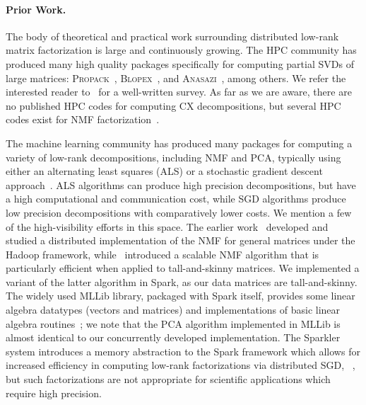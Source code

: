 \paragraph{Prior Work.}The body of theoretical and practical work surrounding distributed low-rank matrix factorization is large and continuously growing. The HPC community has produced many high quality packages specifically for computing partial SVDs of large matrices: \textsc{Propack}~\cite{larsen1998lanczos}, \textsc{Blopex}~\cite{blopex2007}, and \textsc{Anasazi}~\cite{baker2009anasazi}, among others. We refer the interested reader to~\cite{hernandez2009survey} for a well-written survey. As far as we are aware, there are no published HPC codes for computing CX decompositions, but several HPC codes exist for NMF factorization~\cite{kannan2016high}. 

The machine learning community has produced many packages for computing a variety of low-rank decompositions, including NMF and PCA, typically using either an alternating least squares (ALS) or a stochastic gradient descent approach~\cite{gemulla2011large,yun2014nomad,koren2009matrix}. ALS algorithms can produce high precision decompositions, but have a high computational and communication cost, while SGD algorithms produce low precision decompositions with comparatively lower costs. We mention a few of the high-visibility efforts in this space. The earlier work~\cite{liu2010distributed} developed and studied a distributed implementation of the NMF for general matrices under the Hadoop framework, while~\cite{benson2014scalable} introduced a scalable NMF algorithm that is particularly efficient when applied to tall-and-skinny matrices. We implemented a variant of the latter algorithm in Spark, as our data matrices are tall-and-skinny. The widely used MLLib library, packaged with Spark itself, provides some linear algebra datatypes (vectors and matrices) and implementations of basic linear algebra routines~\cite{meng2016mllib}; we note that the PCA algorithm implemented in MLLib is almost identical to our concurrently developed implementation. The Sparkler system introduces a memory abstraction to the Spark framework which allows for increased efficiency in computing low-rank factorizations via distributed SGD, ~\cite{Li2013sparkler}, but such factorizations are not appropriate for scientific applications which require high precision.

